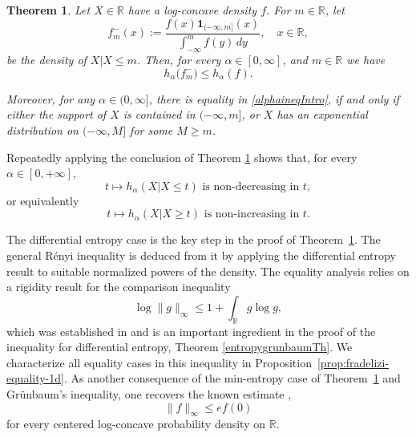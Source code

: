 \documentclass{article}
\theoremstyle{plain}
\newtheorem{theorem}{Theorem}
\theoremstyle{definition}
\newcommand{\1}{\mathbf 1}
\begin{document}

\begin{theorem}
\label{upperThIntro}
Let $X \in \mathbb R$ have a log-concave density $f$. For $m \in \mathbb R$, let
\[
f^{-}_m(x):=\frac{f(x)\mathbf 1_{(-\infty,m]}(x)}{\int_{-\infty}^{m} f(y)\,dy}, \quad x \in \mathbb R,
\]
be the density of $X|X\le m$.
Then, for every $\alpha\in[0,\infty]$, and $m \in \mathbb R$ we have
\begin{equation} \label{alphaineqIntro}
h_\alpha\!\big(f^{-}_m\big)\le h_\alpha(f).
\end{equation}

Moreover, for any $\alpha \in (0,\infty]$, there is equality in \eqref{alphaineqIntro}, if and only if either the support of $X$ is contained in $(-\infty, m]$, or $X$ has an exponential distribution on $(-\infty,M]$ for some $M \geq m$. 
\end{theorem}

Repeatedly applying the conclusion of Theorem \ref{upperThIntro} shows that, for every $\alpha\in [0,+\infty]$, 
$$
    t \mapsto h_{\alpha}(X|X \leq t ) \text{ is non-decreasing in }t,
$$
or equivalently 
\begin{equation} \label{residualfunc}
    t \mapsto h_{\alpha}(X|X \geq t ) \text{ is non-increasing in }t.
\end{equation} 

The differential entropy case is the key step in the proof of
Theorem~\ref{upperThIntro}. The general R\'enyi inequality is deduced
from it by applying the differential entropy result to suitable normalized powers of the density. The equality analysis relies on a
rigidity result for the comparison inequality
$$
\log\|g\|_\infty \le 1+\int_{\mathbb R} g\log g,
$$
which was established in \cite[Proof of Theorem 7]{fradelizi2008increasing} and is an important ingredient in the proof of the inequality for differential entropy, Theorem \ref{entropygrunbaumTh}. We characterize all
equality cases in this inequality in
Proposition~\ref{prop:fradelizi-equality-1d}. As another consequence of
the min-entropy case of Theorem~\ref{upperThIntro} and Gr\"unbaum's
inequality, one recovers the known estimate
\cite[Theorem 4]{fradelizisections}, 
\[
    \|f\|_\infty\leq e f(0)
\]
for every centered log-concave probability density on $\mathbb R$.
\end{document}
